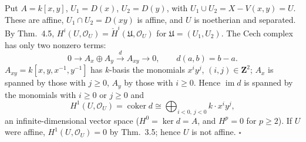 \documentclass[11pt]{article}
\begin{document}
\pf
Put $A=k[x,y]$, $U_1=D(x)$, $U_2=D(y)$, with $U_1\cup U_2=X-V(x,y)=U$. These are affine, $U_1\cap U_2=D(xy)$ is affine, and $U$ is noetherian and separated. By Thm.~4.5, $H^i(U,\mathcal O_U)=\check H^i(\mathfrak U,\mathcal O_U)$ for $\mathfrak U=(U_1,U_2)$. The Cech complex has only two nonzero terms:
\[
0\to A_x\oplus A_y\xrightarrow{\ d\ }A_{xy}\to0,\qquad d(a,b)=b-a .
\]
$A_{xy}=k[x,y,x^{-1},y^{-1}]$ has $k$-basis the monomials $x^iy^j$, $(i,j)\in\mathbf Z^2$; $A_x$ is spanned by those with $j\ge0$, $A_y$ by those with $i\ge0$. Hence $\operatorname{im}d$ is spanned by the monomials with $i\ge0$ or $j\ge0$ and
\[
H^1(U,\mathcal O_U)=\operatorname{coker}d\cong\bigoplus_{i<0,\,j<0}k\cdot x^iy^j,
\]
an infinite-dimensional vector space ($H^0=\ker d=A$, and $H^p=0$ for $p\ge2$). If $U$ were affine, $H^1(U,\mathcal O_U)=0$ by Thm.~3.5; hence $U$ is not affine. \hfill$\square$
\end{document}
